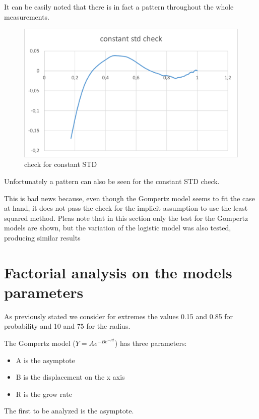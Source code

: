 It can be easily noted that there is in fact a pattern throughout the whole measurements.
\begin{figure}[H]
\centering
    \includegraphics[width= 1\textwidth]{./images/ConstantSTDCheck200.png}
    \caption{check for constant STD}
    \label{fig:STDCheck}
\end{figure}

Unfortunately a pattern can also be seen for the constant STD check. 

This is bad news because, even though the Gompertz model seems to fit the case at hand, it does not pass the check for the implicit assumption to use the least squared method.
Pleas note that in this section only the test for the Gompertz models are shown, but the variation of the logistic model was also tested, producing similar results

\iffalse
\section{Factorial analysis on the models parameters}
As previously stated we consider for extremes the values 0.15 and 0.85 for probability and 10 and 75 for the radius.

The Gompertz model ($ Y = Ae^{-Be^{-Rt}} $) has three parameters:
\begin{itemize}
	\item A is the asymptote
	\item B is the displacement on the x axis
	\item R is the grow rate
\end{itemize}
The first to be analyzed is the asymptote.

